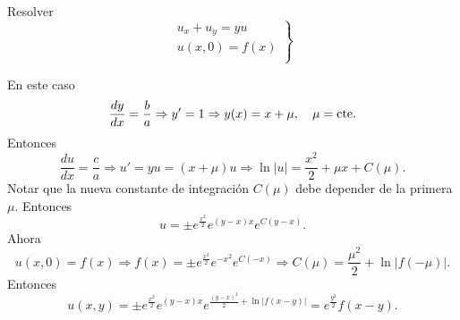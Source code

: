 \begin{ejemplo} Resolver
\begin{equation}\label{eq:EDP_gral_1orden}
  \left.\begin{array}{l}
  u_x+u_y=yu\\
  u(x,0)=f(x)\\
\end{array}\right\}
\end{equation}
\end{ejemplo}
En este caso
\[\frac{dy}{dx}=\frac{b}{a}\Rightarrow y'=1\Rightarrow y(x)=x+\mu,\quad\mu=\hbox{cte}.\]
Entonces
\[\frac{du}{dx}=\frac{c}{a}\Rightarrow u'=yu=(x+\mu)u\Rightarrow \ln|u|=\frac{x^2}{2}+\mu x+C(\mu).\]
Notar que la nueva constante de integración $C(\mu)$ debe depender de la primera $\mu$. Entonces
\[u=\pm e^{\frac{x^2}{2}}e^{(y-x)x}e^{C(y-x)}.\]
Ahora
\[u(x,0)=f(x)\Rightarrow f(x)=\pm e^{\frac{x^2}{2}}e^{-x^2}e^{C(-x)}\Rightarrow C(\mu)=\frac{\mu^2}{2}+\ln|f(-\mu)|.\]
Entonces
\[u(x,y)=\pm e^{\frac{x^2}{2}}e^{(y-x)x}e^{\frac{(y-x)^2}{2}+\ln|f(x-y)|        }
=e^{\frac{y^2}{2}}f(x-y).\]



